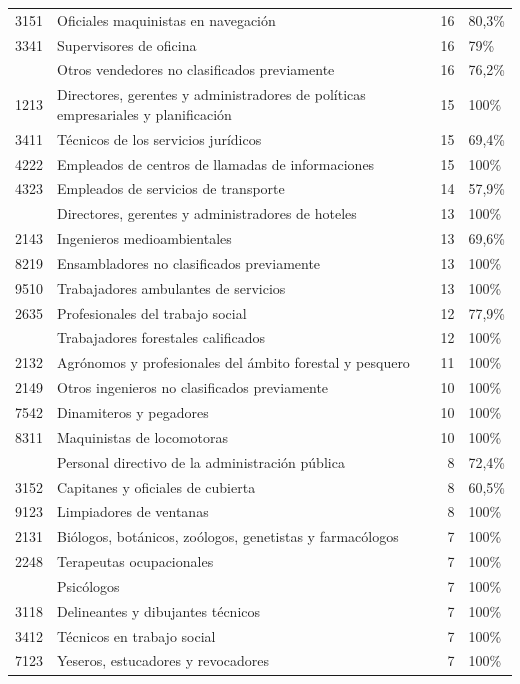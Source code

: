\documentclass[
  11pt,
]{article}
\begin{document}
\begin{longtable}{r>{\raggedright\arraybackslash}p{9cm}rl}
3151 & Oficiales maquinistas en navegación & 16 & 80,3\%\\
3341 & Supervisores de oficina & 16 & 79\%\\
\addlinespace
5249 & Otros vendedores no clasificados previamente & 16 & 76,2\%\\
1213 & Directores, gerentes y administradores de políticas empresariales y planificación & 15 & 100\%\\
3411 & Técnicos de los servicios jurídicos & 15 & 69,4\%\\
4222 & Empleados de centros de llamadas de informaciones & 15 & 100\%\\
4323 & Empleados de servicios de transporte & 14 & 57,9\%\\
\addlinespace
1411 & Directores, gerentes y administradores de hoteles & 13 & 100\%\\
2143 & Ingenieros medioambientales & 13 & 69,6\%\\
8219 & Ensambladores no clasificados previamente & 13 & 100\%\\
9510 & Trabajadores ambulantes de servicios & 13 & 100\%\\
2635 & Profesionales del trabajo social & 12 & 77,9\%\\
\addlinespace
6210 & Trabajadores forestales calificados & 12 & 100\%\\
2132 & Agrónomos y profesionales del ámbito forestal y pesquero & 11 & 100\%\\
2149 & Otros ingenieros no clasificados previamente & 10 & 100\%\\
7542 & Dinamiteros y pegadores & 10 & 100\%\\
8311 & Maquinistas de locomotoras & 10 & 100\%\\
\addlinespace
1112 & Personal directivo de la administración pública & 8 & 72,4\%\\
3152 & Capitanes y oficiales de cubierta & 8 & 60,5\%\\
9123 & Limpiadores de ventanas & 8 & 100\%\\
2131 & Biólogos, botánicos, zoólogos, genetistas y farmacólogos & 7 & 100\%\\
2248 & Terapeutas ocupacionales & 7 & 100\%\\
\addlinespace
2634 & Psicólogos & 7 & 100\%\\
3118 & Delineantes y dibujantes técnicos & 7 & 100\%\\
3412 & Técnicos en trabajo social & 7 & 100\%\\
7123 & Yeseros, estucadores y revocadores & 7 & 100\%\\

\end{longtable}
\end{document}
